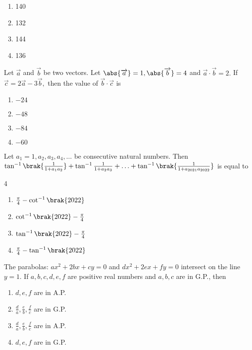 \begin{multicols}{4}
\begin{enumerate}
    \item 140 
    \item 132 
    \item 144 
    \item 136 
\end{enumerate}
\end{multicols}


\item Let $\overrightarrow{a}$ and $\overrightarrow{b}$ be two vectors. Let $\abs{\overrightarrow{a}} = 1, \abs{\overrightarrow{b}} = 4$ and $\overrightarrow{a} \cdot \overrightarrow{b} = 2.$ If $\overrightarrow{c} = 2\overrightarrow{a} - 3\overrightarrow{b},$ then the value of $\overrightarrow{b} \cdot \overrightarrow{c}$ is   \hfill {}

\begin{multicols}{4}
\begin{enumerate}
    \item $-24$ 
    \item $-48$ 
    \item $-84$ 
    \item $-60$ 
\end{enumerate}
\end{multicols}


\item Let $a_1 = 1,a_2,a_3,a_4,\ldots$ be consecutive natural numbers. Then $\tan ^{-1}\brak{\frac{1}{1 + a_1a_2}} + \tan ^{-1} \frac{1}{1 + a_2a_3} + \ldots + \tan ^{-1} \brak{\frac{1}{1 + a_{2021}a_{2022}}}$ is equal to  \hfill {}\begin {multicols}{4}
\begin{enumerate}
    \item $\frac{\pi}{4} - \cot ^{-1}\brak{2022}$ 
    \item $\cot ^{-1}\brak{2022} - \frac{\pi}{4}$ 
    \item $\tan ^{-1} \brak{2022} - \frac{\pi}{4}$ 
    \item $\frac{\pi}{4} - \tan ^{-1}\brak{2022}$ 
\end{enumerate}
\end{multicols}

\item The parabolas: $a x^2 + 2 b x + c y = 0 $ and $d x^2 + 2 e x + f y = 0$ intersect on the line $y = 1$. If $a, b, c, d, e, f$ are positive real numbers and $a, b, c$ are in G.P., then   \hfill {}

\begin{multicols}{4}
\begin{enumerate}
    \item $d, e, f$ are in A.P.
    \item $\frac{d}{a}, \frac{e}{b}, \frac{f}{c}$ are in G.P.
    \item $\frac{d}{a}, \frac{e}{b}, \frac{f}{c}$ are in A.P.
    \item $d, e, f$ are in G.P.
\end{enumerate}
\end{multicols} 
%

